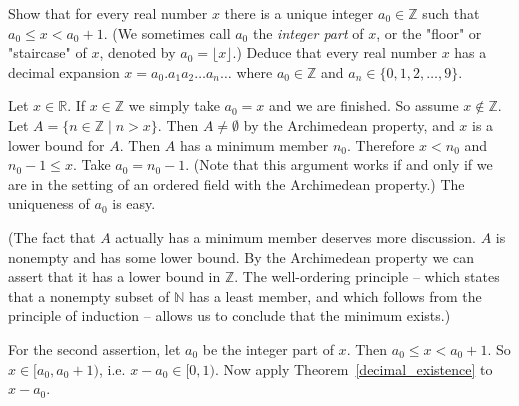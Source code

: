 \documentclass[11pt,dvipsnames]{book}
\numberwithin{equation}{section} %
\numberwithin{figure}{section} %
\numberwithin{table}{section} %
\begin{document}
\begin{exercise}
Show that for every real number $x$ there is a unique integer $a_0 \in \mathbb{Z}$ such that $a_0 \leq x < a_0 +1$. (We sometimes call $a_0$ the {\em integer part} of $x$, or the "floor" or "staircase" of $x$, denoted by $a_0 = \lfloor x \rfloor$.) Deduce that every real number $x$ has a decimal expansion 
$x = a_0.a_1 a_2 \dots a_n \dots$
where $a_0 \in \mathbb{Z}$ and $a_n \in \{0,1,2, \dots, 9\}$.
\begin{solution}
Let $x \in \mathbb{R}$. If $x \in \mathbb{Z}$ we simply take $a_0 = x$ and we are finished. So assume $x \notin \mathbb{Z}$. Let $A= \{ n \in \mathbb{Z} \; | \; n > x\}$. Then $A \neq \emptyset$ by the Archimedean property, and $x$ is a lower bound for $A$. Then $A$ has a minimum member $n_0$. Therefore $x < n_0$ and $ n_0 - 1 \leq x$. Take $a_0 = n_0 -1$. (Note that this argument works if and only if we are in the setting of an ordered field with the Archimedean property.)
The uniqueness of $a_0$ is easy. 

(The fact that $A$ actually has a minimum member deserves more discussion. $A$ is nonempty and has some lower bound. By the Archimedean property we can assert that it has a lower bound in $\mathbb{Z}$. The well-ordering principle -- which states that a nonempty subset of $\mathbb{N}$ has a least member, and which follows from the principle of induction -- allows us to conclude that the minimum exists.)

\medskip
For the second assertion, let $a_{0}$ be the integer part of $x$. Then
$a_{0}\leq x<a_{0}+1$.
So $x\in [a_{0},a_{0}+1)$, i.e. $x - a_0 \in [0,1)$. Now apply Theorem~\ref{decimal_existence} to $x - a_0$.
\end{solution}
\end{exercise}
\end{document}
